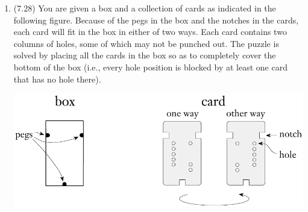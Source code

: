 \documentclass[11pt]{article}
\begin{document}
\begin{enumerate}
{}
\newpage
\item (7.28) You are given a box and a collection of cards as indicated in the following figure. Because of the pegs in the box and the notches in the cards, each card will fit in the box in either of two ways. Each card contains two columns of holes, some of which may not be punched out. The puzzle is solved by placing all the cards in the box so as to completely cover the bottom of the box (i.e., every hole position is blocked by at least one card that has no hole there). 
\begin{center}
\includegraphics[width=.5\linewidth]{common/A15-puzzle.png}
\end{center}


\end{enumerate}
\end{document}
